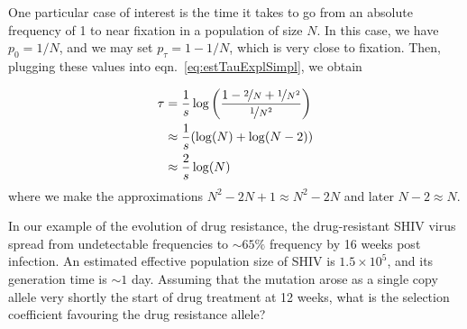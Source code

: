 One particular case of interest is the time it takes to go from an absolute
frequency of 1 to near fixation in a population of size $N$.  In this case, we
have $p_0 = 1/N$, and we may set $p_{\tau} = 1 - 1/N$, which is very close to
fixation. Then, plugging these values into eqn.\ \eqref{eq:estTauExplSimpl}, we
obtain

\begin{align}
  \tau &= \frac{1}{s} \log\left( \frac{1 - \nicefrac{2}{N} +
      \nicefrac{1}{N^2}}{\nicefrac{1}{N^2}} \right) \nonumber \\
  &\approx \frac{1}{s} (\log(N) + \log(N-2)) \nonumber \\
  &\approx \frac{2}{s} \log(N)  \label{eq:fixTimeSimpl}
\end{align}
%
where we make the approximations $N^2 - 2N + 1 \approx N^2 - 2N$ and later
$N-2 \approx N$.


\begin{question}
In our example of the evolution of drug resistance, the drug-resistant SHIV virus spread from undetectable frequencies to $\sim 65\%$ frequency by 16 weeks post infection. An estimated effective population size of SHIV is $1.5 \times 10^5$, and its generation time is $\sim 1$ day. Assuming that the mutation arose as a single copy allele very shortly the start of drug treatment at 12 weeks, what is the selection coefficient favouring the drug resistance allele?  
\end{question}





